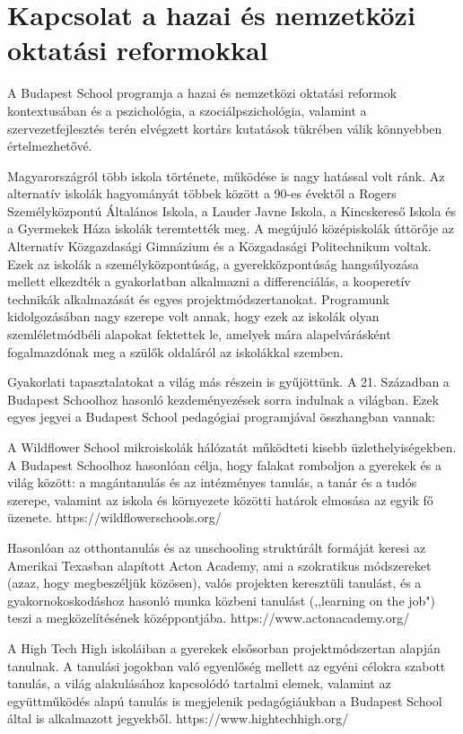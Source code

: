 \section{Kapcsolat a hazai és nemzetközi oktatási
  reformokkal}\label{sec:kapcsolat_reformokkal}

A Budapest School programja a hazai és nemzetközi oktatási reformok
kontextusában és a pszichológia, a szociálpszichológia, valamint a
szervezetfejlesztés terén elvégzett kortárs kutatások tükrében válik
könnyebben értelmezhetővé.

Magyarországról több iskola története, működése is nagy hatással volt ránk. Az
alternatív iskolák hagyományát többek között a 90-es évektől a Rogers
Személyközpontú Általános Iskola, a Lauder Javne Iskola, a Kincskereső
Iskola és a Gyermekek Háza iskolák teremtették meg. A megújuló
középiskolák úttörője az Alternatív Közgazdasági Gimnázium és a
Közgadasági Politechnikum voltak. Ezek az iskolák a személyközpontúság,
a gyerekközpontúság hangsúlyozása mellett elkezdték a gyakorlatban
alkalmazni a differenciálás, a kooperetív technikák alkalmazását és
egyes projektmódszertanokat. Programunk kidolgozásában nagy szerepe volt
annak, hogy ezek az iskolák olyan szemléletmódbéli alapokat fektettek
le, amelyek mára alapelvárásként fogalmazdónak meg a szülők oldaláról az
iskolákkal szemben.

Gyakorlati tapasztalatokat a világ más részein is gyűjöttünk. A 21.
Században a Budapest Schoolhoz hasonló kezdeményezések sorra indulnak a
világban. Ezek egyes jegyei a Budapest School pedagógiai programjával
összhangban vannak:

A Wildflower School mikroiskolák hálózatát működteti kisebb
üzlethelyiségekben. A Budapest Schoolhoz hasonlóan célja, hogy falakat
romboljon a gyerekek és a világ között: a magántanulás és az intézményes
tanulás, a tanár és a tudós szerepe, valamint az iskola és környezete
közötti határok elmosása az egyik fő üzenete.
https://wildflowerschools.org/

Hasonlóan az otthontanulás és az  unschooling struktúrált formáját keresi az
Amerikai Texasban alapított Acton Academy, ami a szokratikus módszereket (azaz,
hogy megbeszéljük közösen), valós projekten keresztüli tanulást, és a
gyakornokoskodáshoz hasonló munka közbeni tanulást (,,learning on the job")
teszi a megközelítésének középpontjába.
https://www.actonacademy.org/

A High Tech High iskoláiban a gyerekek elsősorban projektmódszertan
alapján tanulnak. A tanulási jogokban való egyenlőség mellett az egyéni
célokra szabott tanulás, a világ alakulásához kapcsolódó tartalmi
elemek, valamint az együttműködés alapú tanulás is megjelenik
pedagógiáukban a Budapest School által is alkalmazott jegyekből.
https://www.hightechhigh.org/

